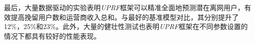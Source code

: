 \begin{abstractcn}
	\par
	最后，大量数据驱动的实验表明\emph{UPRF}框架可以精准全面地预测潜在离网用户，有效提高挽留用户数和运营商收入总和。与最好的基准模型对比，其分别提升了12\%，25\%和23\%。此外，大量的健壮性测试也表明\emph{UPRF}框架在不同参数设置的情况下都具有较好的性能表现。	

\end{abstractcn}
